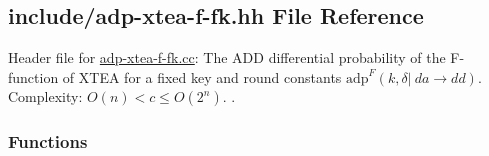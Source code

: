 \hypertarget{adp-xtea-f-fk_8hh}{\subsection{include/adp-\/xtea-\/f-\/fk.hh \-File \-Reference}
\label{adp-xtea-f-fk_8hh}
}


\-Header file for \hyperlink{adp-xtea-f-fk_8cc}{adp-\/xtea-\/f-\/fk.\-cc}\-: \-The \-A\-D\-D differential probability of the \-F-\/function of \-X\-T\-E\-A for a fixed key and round constants $\mathrm{adp}^{F}(k, \delta |~ da \rightarrow dd)$. \-Complexity\-: $ O(n) < c \le O(2^n) $. .  


\subsubsection*{\-Functions}
